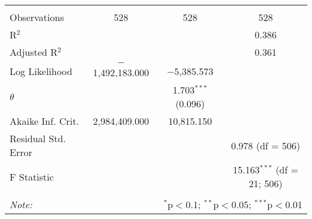 \begin{table}[!htbp]
\begin{tabular}{@{\extracolsep{5pt}}lccc}
 \hline \\[-1.8ex] 
Observations & 528 & 528 & 528 \\ 
R$^{2}$ &  &  & 0.386 \\ 
Adjusted R$^{2}$ &  &  & 0.361 \\ 
Log Likelihood & $-$1,492,183.000 & $-$5,385.573 &  \\ 
$\theta$ &  & 1.703$^{***}$  (0.096) &  \\ 
Akaike Inf. Crit. & 2,984,409.000 & 10,815.150 &  \\ 
Residual Std. Error &  &  & 0.978 (df = 506) \\ 
F Statistic &  &  & 15.163$^{***}$ (df = 21; 506) \\ 
\hline 
\hline \\[-1.8ex] 
\textit{Note:}  & \multicolumn{3}{r}{$^{*}$p$<$0.1; $^{**}$p$<$0.05; $^{***}$p$<$0.01} \\ 
\end{tabular} 
\end{table} 
